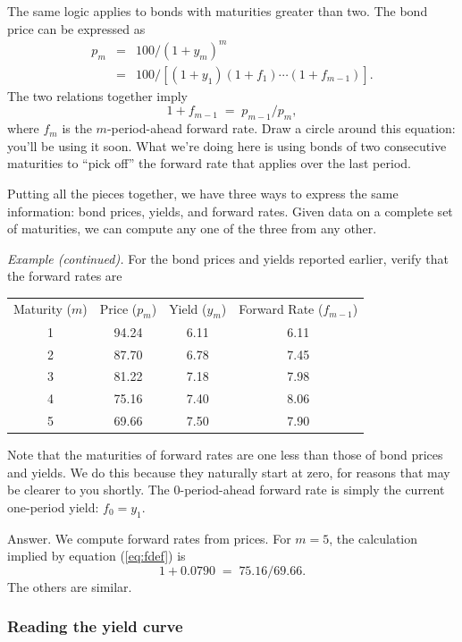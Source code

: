\documentclass[letterpaper,12pt]{article}
\begin{document}
The same logic applies to bonds with maturities greater than two.
The bond price can be expressed as
\begin{eqnarray*}
        p_m &=& 100/(1+y_m)^m \\
            &=& 100/ [(1+y_1)(1+f_1) \cdots (1+f_{m-1})] .
\end{eqnarray*}
The two relations together imply
\begin{equation}
    1+f_{m-1} \;=\; p_{m-1}/p_{m} ,
    \label{eq:fdef}
\end{equation}
where $f_m$ is the $m$-period-ahead forward rate.  Draw a circle
around this equation: you'll be using it soon.  What we're doing
here is using bonds of two consecutive maturities to ``pick off''
the forward rate that applies over the last period.

Putting all the pieces together, we have three ways to express the
same information:  bond prices, yields, and forward rates. Given
data on a complete set of maturities, we can compute any one of
the three from any other.

{\it Example (continued).\/} For the bond prices and yields
reported earlier, verify that the forward rates are
%
\begin{center}
\begin{tabular}{cccc}
  Maturity ($m$)  &  Price ($p_m$)  &  Yield ($y_m$)  & Forward Rate ($f_{m-1}$) \\
     1      &  94.24  &   6.11 &   6.11    \\
     2      &  87.70  &   6.78 &   7.45         \\
     3      &  81.22  &   7.18 &   7.98     \\
     4      &  75.16  &   7.40 &   8.06       \\
     5      &  69.66  &   7.50 &   7.90
\end{tabular}
\end{center}
Note that the maturities of forward rates are one less than those
of bond prices and yields.  We do this because they naturally
start at zero, for reasons that may be clearer to you shortly. The
0-period-ahead forward rate is simply the current one-period
yield:   $f_0 = y_1$.

Answer.  We compute forward rates from prices.  For $m=5$, the
calculation implied by equation (\ref{eq:fdef}) is
\[
    1 + 0.0790 \;=\; 75.16/69.66.
\]
The others are similar.


\subsubsection*{Reading the yield curve}
\end{document}
